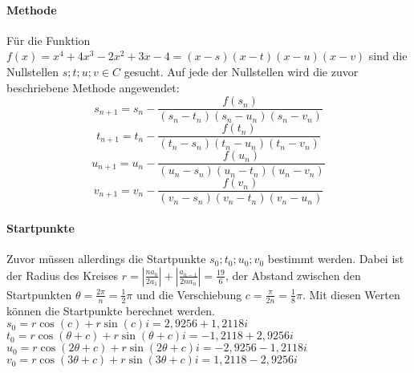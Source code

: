 \documentclass[12pt]{article}
\begin{document}
\paragraph{Methode}
Für die Funktion $f(x) = x^4 + 4x^3 - 2x^2 + 3x - 4 = (x-s)(x-t)(x-u)(x-v)$ sind die Nullstellen $s;t;u;v \in C$ gesucht. Auf jede der Nullstellen wird die zuvor beschriebene Methode angewendet:
\begin{displaymath}
    s_{n+1} = s_n-\frac{f(s_n)}{(s_n-t_n)(s_n-u_n)(s_n-v_n)}
\end{displaymath}
\begin{displaymath}
    t_{n+1} = t_n-\frac{f(t_n)}{(t_n-s_n)(t_n-u_n)(t_n-v_n)}
\end{displaymath}
\begin{displaymath}
    u_{n+1} = u_n-\frac{f(u_n)}{(u_n-s_n)(u_n-t_n)(u_n-v_n)}
\end{displaymath}
\begin{displaymath}
    v_{n+1} = v_n-\frac{f(v_n)}{(v_n-s_n)(v_n-t_n)(v_n-u_n)}
\end{displaymath}
\paragraph{Startpunkte}
Zuvor müssen allerdings die Startpunkte $s_0;t_0;u_0;v_0$ bestimmt werden. Dabei ist der Radius des Kreises $r = |\frac{na_0}{2a_1}| + |\frac{a_{n-1}}{2na_n}| = \frac{19}{6}$, der Abstand zwischen den Startpunkten $\theta = \frac{2\pi}{n} = \frac{1}{2}\pi$ und die Verschiebung $c = \frac{\pi}{2n} = \frac{1}{8}\pi$. Mit diesen Werten können die Startpunkte berechnet werden. \\
$s_0 = r \cos(c) + r \sin(c)i = 2,9256 + 1,2118i$ \\
$t_0 = r \cos(\theta+c) + r \sin(\theta+c)i = -1,2118 + 2,9256i$ \\
$u_0 = r \cos(2\theta+c) + r \sin(2\theta+c)i = -2,9256 - 1,2118i$ \\
$v_0 = r \cos(3\theta+c) + r \sin(3\theta+c)i = 1,2118 - 2,9256i$
\end{document}
